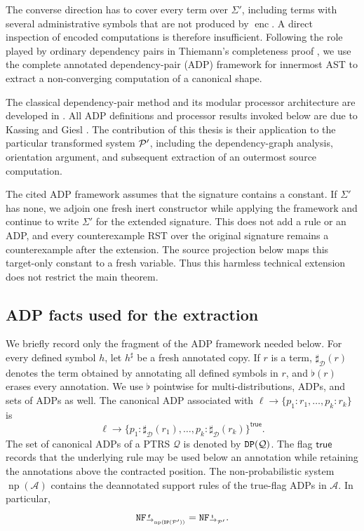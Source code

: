 The converse direction has to cover every term over \(\Sigma'\), including
terms with several administrative symbols that are not produced by
\(\operatorname{enc}\).  A direct inspection of encoded computations is
therefore insufficient.  Following the role played by ordinary dependency
pairs in Thiemann's completeness proof
\cite{thiemann_2009_outermost}, we use the complete annotated
dependency-pair (ADP) framework for innermost AST
\cite{kassing_giesl_2026_adp} to extract a non-converging computation of a
canonical shape.

The classical dependency-pair method and its modular processor architecture
are developed in \cite{arts_giesl_2000_dependency_pairs,giesl2006mechanizing}.
All ADP definitions and processor results invoked below are due to Kassing and
Giesl \cite{kassing_giesl_2026_adp}.  The contribution of this thesis is their
application to the particular transformed system \(\P'\), including the
dependency-graph analysis, orientation argument, and subsequent extraction of
an outermost source computation.

The cited ADP framework assumes that the signature contains a constant.  If
\(\Sigma'\) has none, we adjoin one fresh inert constructor while applying the
framework and continue to write \(\Sigma'\) for the extended signature.  This
does not add a rule or an ADP, and every counterexample RST over the original
signature remains a counterexample after the extension.  The source projection
below maps this target-only constant to a fresh variable.  Thus this harmless
technical extension does not restrict the main theorem.

\subsection{ADP facts used for the extraction}
\label{sec:adp-extraction-facts}

We briefly record only the fragment of the ADP framework needed below.  For
every defined symbol \(h\), let \(h^{\sharp}\) be a fresh annotated copy.  If \(r\) is a
term, \(\sharp_{\mathcal D}(r)\) denotes the term obtained by annotating all
  defined symbols in \(r\), and \(\flat(r)\) erases every annotation.  We use
  \(\flat\) pointwise for multi-distributions, ADPs, and sets of ADPs as well.  The
canonical ADP associated with
\(\ell\to\{p_1:r_1,\ldots,p_k:r_k\}\) is
\[
  \ell\to
  \{p_1:\sharp_{\mathcal D}(r_1),\ldots,
    p_k:\sharp_{\mathcal D}(r_k)\}^{\mathsf{true}}.
\]
The set of canonical ADPs of a PTRS \(\mathcal Q\) is denoted by
\(\DP{\mathcal Q}\).  The flag \(\mathsf{true}\) records that the underlying
rule may be used below an annotation while retaining the annotations above the
contracted position.  The non-probabilistic system
\(\operatorname{np}(\mathcal A)\) contains the deannotated support rules of
the true-flag ADPs in \(\mathcal A\).  In particular,
\[
  \NF_{\fto_{\operatorname{np}(\DP{\P'})}}
    =\NF_{\ito_{\P'}}.
\]

